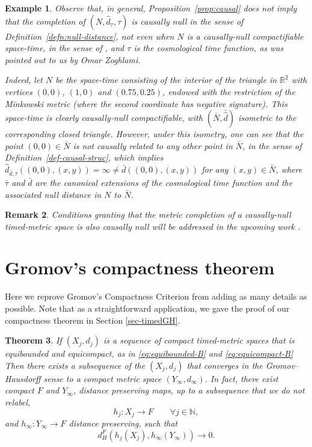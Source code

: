 \documentclass[a4paper,12pt,reqno]{amsart}
\theoremstyle{plain}
\newtheorem{thm}{Theorem}[section]
\newtheorem{rmrk}[thm]{Remark}
\newtheorem{example}[thm]{Example}
\begin{document}
\begin{example}
    Observe that, in general, Proposition~\ref{prop:causal} does not imply that the completion of $(N, \hat d_{\tau},\tau)$ is causally null in the sense of Definition~\ref{defn:null-distance}, not even when $N$ is a causally-null compactifiable space-time, in the sense of \cite{SakSor-Notions}, and $\tau$ is the cosmological time function, as was pointed out to us by Omar Zoghlami. 
    
    Indeed, let $N$ be the space-time consisting of the interior of the triangle in $\mathbb{R}^2$ with vertices $(0,0)$, $(1,0)$ and $(0.75,0.25)$, endowed with the restriction of the Minkowski metric (where the second coordinate has negative signature). This space-time is clearly causally-null compactifiable, with $\left(\bar{N},\bar{\hat{d}}\right)$ isometric to the corresponding closed triangle. However, under this isometry, one can see that the point $(0,0)\in \bar{N}$ is not causally related to any other point in $\bar{N}$, in the sense of Definition~\ref{def-causal-struc}, which implies $\hat{d}_{\bar{d},\bar{\tau}}((0,0),(x,y))=\infty\neq \bar{d}((0,0),(x,y))$ for any $(x,y)\in \bar{N}$, where $\bar{\tau}$ and $\bar{d}$ are the canonical extensions of the cosmological time function and the associated null distance in $N$ to $\bar{N}$. 
\end{example}
\begin{rmrk}
    Conditions granting that the metric completion of a causally-null timed-metric space is also causally null will be addressed in the upcoming work \cite{prados-zoghlami}.
\end{rmrk}





\appendix

\section{Gromov's compactness theorem}\label{sec-appendix}

Here we reprove Gromov's Compactness Criterion from \cite{Gromov-poly} adding as many details as possible. Note that as a straightforward application, we gave the proof of our compactness theorem in Section \ref{sec-timedGH}. 


\begin{thm}\label{thm-GHcriterion}
If $(X_j,d_j)$ is a sequence of compact timed-metric spaces that is equibounded and equicompact, as in \eqref{eq:equibounded-B} and \eqref{eq:equicompact-B}
Then there exists a subsequence of the $(X_j, d_j)$ that converges in the Gromov--Hausdorff sense to a compact metric space $(Y_\infty, d_\infty)$. In fact, there exist compact $F$ and $Y_\infty$, distance preserving maps, up to a subsequence that we do not relabel,
\[
h_j: X_j \to F \qquad \forall j\in \mathbb N,
\]
and $h_\infty : Y_\infty \to  F$ distance preserving, 
 such that 
\begin{equation}\label{eq-GHcriterion-H}
    d_H^{F} (h_j(X_j),h_\infty(Y_\infty))\to 0.
\end{equation}
\end{thm}
\end{document}
